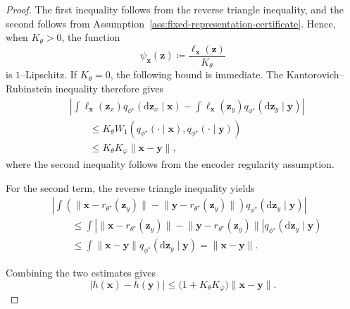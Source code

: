 \documentclass[pdflatex,sn-mathphys-num]{sn-jnl}%
\theoremstyle{thmstyleone}%
\theoremstyle{thmstyletwo}%
\theoremstyle{thmstylethree}%
\begin{document}
\begin{appendices}
\begin{proof}
The first inequality follows from the reverse triangle inequality, and the second follows from Assumption~\ref{ass:fixed-representation-certificate}. Hence, when $K_\theta>0$, the function
\[
  \psi_{\mathbf{x}}(\mathbf{z})
  \coloneqq
  \frac{\ell_{\mathbf{x}}(\mathbf{z})}{K_\theta}
\]
is $1$--Lipschitz. If $K_\theta=0$, the following bound is immediate. The Kantorovich--Rubinstein inequality therefore gives
\begin{align*}
&
\left|
\int
  \ell_{\mathbf{x}}(\mathbf{z}_x)
  q_{\phi^\star}
    (\mathrm{d}\mathbf{z}_x\mid\mathbf{x})
-
\int
  \ell_{\mathbf{x}}(\mathbf{z}_y)
  q_{\phi^\star}
    (\mathrm{d}\mathbf{z}_y\mid\mathbf{y})
\right|
\\
&\qquad\leq
K_\theta
W_1\!\left(
  q_{\phi^\star}(\cdot\mid\mathbf{x}),
  q_{\phi^\star}(\cdot\mid\mathbf{y})
\right)
\\
&\qquad\leq
K_\theta K_\varphi
\bigl\|\mathbf{x}-\mathbf{y}\bigr\|,
\end{align*}
where the second inequality follows from the encoder regularity assumption.

For the second term, the reverse triangle inequality yields
\begin{align*}
&
\left|
\int
  \left(
    \bigl\|\mathbf{x}-r_{\theta^\star}(\mathbf{z}_y)\bigr\|
    -
    \bigl\|\mathbf{y}-r_{\theta^\star}(\mathbf{z}_y)\bigr\|
  \right)
  q_{\phi^\star}
    (\mathrm{d}\mathbf{z}_y\mid\mathbf{y})
\right|
\\
&\qquad\leq
\int
\left|
  \bigl\|\mathbf{x}-r_{\theta^\star}(\mathbf{z}_y)\bigr\|
  -
  \bigl\|\mathbf{y}-r_{\theta^\star}(\mathbf{z}_y)\bigr\|
\right|
q_{\phi^\star}
  (\mathrm{d}\mathbf{z}_y\mid\mathbf{y})
\\
&\qquad\leq
\int
  \bigl\|\mathbf{x}-\mathbf{y}\bigr\|
  q_{\phi^\star}
    (\mathrm{d}\mathbf{z}_y\mid\mathbf{y})
=
\bigl\|\mathbf{x}-\mathbf{y}\bigr\|.
\end{align*}

Combining the two estimates gives
\begin{equation*}
  \bigl|h(\mathbf{x})-h(\mathbf{y})\bigr|
  \leq
  \bigl(1+K_\theta K_\varphi\bigr)
  \bigl\|\mathbf{x}-\mathbf{y}\bigr\|.
  \label{eq:h-lipschitz}
\end{equation*}


\end{proof}
\end{appendices}
\end{document}
